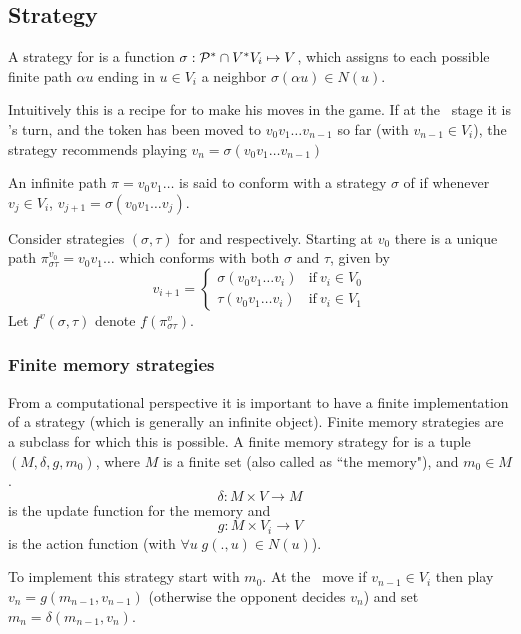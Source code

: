 \subsection{Strategy}
A strategy for  is a function $\sigma : \mathcal{P}^{*} \cap V^*V_{i} \mapsto V$, which assigns to each possible finite path $\alpha u$ ending in $ u \in V_i$ a neighbor $\sigma(\alpha u) \in N(u)$.

Intuitively this is a recipe for  to make his moves in the game. If at the \nth\ stage it is 's turn, and the token has been moved to $v_0v_1 \ldots v_{n-1}$ so far (with $v_{n-1} \in V_i$), the strategy recommends playing $v_n=\sigma(v_0v_1 \ldots v_{n-1})$

An infinite path $\pi= v_0 v_1 \ldots$ is said to conform with a strategy $\sigma$ of  if whenever $v_j \in V_i$, $v_{j+1}=\sigma(v_0 v_1 \ldots v_j)$.

Consider strategies $(\sigma,\tau)$ for  and  respectively. Starting at $v_0$ there is a unique path $\pi^{v_0}_{\sigma\tau}= v_0 v_1 \ldots $ which conforms with both $\sigma$ and $\tau$, given by
\begin{equation*}
v_{i+1} = \begin{cases}
\sigma(v_0v_1\ldots v_i) & \text{if}\  v_i \in V_0\\
\tau(v_0v_1\ldots v_i) & \text{if}\  v_i \in V_1
\end{cases}
\end{equation*}
Let $f^{v}(\sigma,\tau)$ denote $f(\pi^v_{\sigma\tau})$.

\subsubsection{Finite memory strategies}
From a computational perspective it is important to have a finite implementation of a strategy (which is generally an infinite object). Finite memory strategies are a subclass for which this is possible. A finite memory strategy for  is a tuple $(M,\delta,g,m_0)$, where $M$ is a finite set (also called as ``the memory"), and $m_0 \in M$.
\[
    \delta : M \times V \to M
\]
is the update function for the memory and
\[
    g : M \times V_i \to V
\]
is the action function (with $\forall u \; g(.,u) \in N(u)$).

To implement this strategy start with $m_0$. At the \nth\ move if $v_{n-1} \in V_i$ then play $v_n=g(m_{n-1},v_{n-1})$ (otherwise the opponent decides $v_n$) and set $m_n = \delta(m_{n-1},v_n)$.

